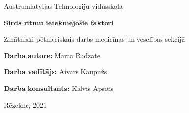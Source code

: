\documentclass[12pt]{article}
\begin{document}
\begin{titlepage}
   \begin{center}
       \vspace*{1cm}

       \Large Austrumlatvijas Tehnoloģiju vidusskola
            
       \vspace{8cm}

       \textbf{\huge Sirds ritmu ietekmējošie faktori}\
       
       \vspace{1cm}
       
       \Large Zinātniski pētnieciskais darbs medicīnas un veselības sekcijā
       
       \vspace{2cm}
       
       \end{center}   
\begin{flushright}
\Large \textbf{Darba autore:} Marta Rudzāte 

\Large \textbf{Darba vadītājs:} Aivars Kaupužs

\Large \textbf{Darba konsultants:} Kalvis Apsītis
\end{flushright}


    \begin{center}

       \vfill
        
       \vspace{0.8cm}
    
       \Large Rēzekne, 2021
            
    \end{center}
\end{titlepage}
\end{document}
